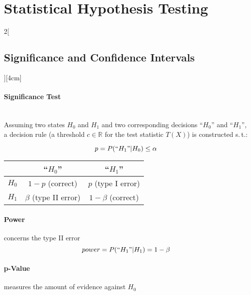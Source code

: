 \documentclass[8pt]{extarticle}
\begin{document}
  


 
\section{Statistical Hypothesis Testing}

\begin{multicols}{2}[\subsection{Significance and Confidence Intervals}][4cm]

\paragraph{Significance Test}  \ \\
\noindent Assuming two states $H_0$ and $H_1$ and two corresponding decisions ``$H_0$'' and ``$H_1$'', a decision rule (a threshold $c \in \mathbb{R}$ for the test statistic $T(X)$) is constructed s.\,t.:

$$p = P(``H_1"|H_0) \leq \alpha$$

\begin{center}
\begin{tabular}{c |c c}
& ``$H_0$'' & ``$H_1$'' \\
\hline
$H_0$ & $1-p$ (correct) & $p$ (type I error)\\
$H_1$ & $\beta$ (type II error) & $1-\beta$ (correct) \\
\end{tabular}
\end{center}

\paragraph{Power} concerns the type II error \ \\

$$power = P(``H_1"|H_1) = 1-\beta$$

\paragraph{p-Value} measures the amount of evidence against $H_0$


\end{multicols}
\end{document}
